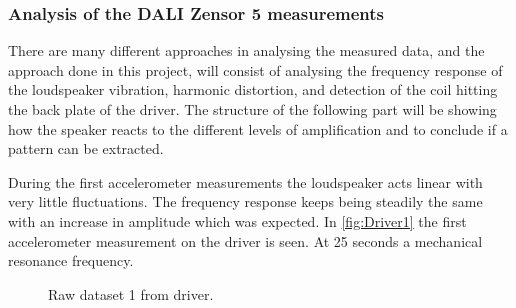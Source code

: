 \subsubsection{Analysis of the DALI Zensor 5 measurements}

There are many different approaches in analysing the measured data, and the approach done in this project, will consist of analysing the frequency response of the loudspeaker vibration, harmonic distortion, and detection of the coil hitting the back plate of the driver. The structure of the following part will be showing how the speaker reacts to the different levels of amplification and to conclude if a pattern can be extracted.




During the first accelerometer measurements the loudspeaker acts linear with very little fluctuations. The frequency response keeps being steadily the same with an increase in amplitude which was expected. In \autoref{fig:Driver1} the first accelerometer measurement on the driver is seen. At 25 seconds a mechanical resonance frequency. 


\begin{figure}[H]
\centering
\begin{subfigure}[t]{0.335\textwidth}
	
\end{subfigure}
\caption{Raw dataset 1 from driver.}
\label{fig:Driver1}
\end{figure}

